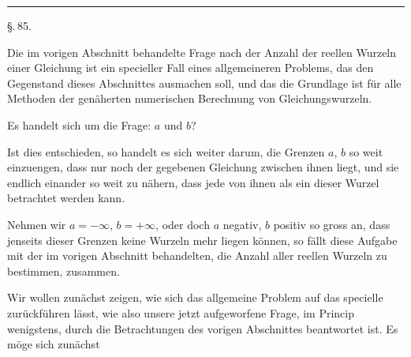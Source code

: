 \begin{center}


\rule{0.3\linewidth}{0.4pt}

\S.\,85.

\end{center}

Die im vorigen Abschnitt behandelte Frage nach der Anzahl der reellen Wurzeln einer Gleichung ist ein specieller Fall eines allgemeineren Problems, das den Gegenstand dieses Abschnittes ausmachen soll, und das die Grundlage ist für alle Methoden der genäherten numerischen Berechnung von Gleichungswurzeln.

Es handelt sich um die Frage:  $a$ und $b$?

Ist dies entschieden, so handelt es sich weiter darum, die Grenzen $a$, $b$ so weit einzuengen, dass nur noch  der gegebenen Gleichung zwischen ihnen liegt, und sie endlich einander so weit zu nähern, dass jede von ihnen als ein  dieser Wurzel betrachtet werden kann.

Nehmen wir $a = -\infty$, $b = +\infty$, oder doch $a$ negativ, $b$ positiv so gross an, dass jenseits dieser Grenzen keine Wurzeln mehr liegen können, so fällt diese Aufgabe mit der im vorigen Abschnitt behandelten, die Anzahl aller reellen Wurzeln zu bestimmen, zusammen.

Wir wollen zunächst zeigen, wie sich das allgemeine Problem auf das specielle zurückführen lässt, wie also unsere jetzt aufgeworfene Frage, im Princip wenigstens, durch die Betrachtungen des vorigen Abschnittes beantwortet ist. Es möge sich zunächst
